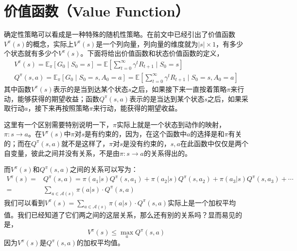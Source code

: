 \documentclass[a4paper]{article}
\begin{document}
\section{价值函数（Value Function）}
确定性策略可以看成是一种特殊的随机性策略。在前文中已经引出了价值函数$V^\pi(s)$的概念，实际上$V^\pi(s)$是一个列向量，列向量的维度就为$|s|\times 1$，有多少个状态就有多少个$V^\pi(s)$。下面将给出价值函数和状态价值函数的定义，
\begin{equation}\begin{array}{l}
V^{\pi}(s)=\mathbb{E}_{\pi}\left[G_{0} \mid S_{0}=s\right]=\mathbb{E}\left[\sum_{t=0}^{\infty} \gamma^{t} R_{t+1} \mid S_{0}=s\right] \\
Q^{\pi}(s, a)=\mathbb{E}_{\pi}\left[G_{0} \mid S_{0}=s, A_{0}=a\right]=\mathbb{E}\left[\sum_{t=0}^{\infty} \gamma^{t} R_{t+1} \mid S_{0}=s, A_{0}=a\right]
\end{array}\end{equation}
其中函数$V^\pi(s)$表示的是当到达某个状态$s$之后，如果接下来一直按着策略$\pi$来行动，能够获得的期望收益；函数$Q^\pi(s,a)$表示的是当达到某个状态$s$之后，如果采取行动$a$，接下来再按照策略$\pi$来行动，能获得的期望收益。

这里有一个区别需要特别说明一下，$\pi$实际上就是一个状态到动作的映射，$\pi:s \to a$。在$V^\pi(s)$中$\pi$对$s$是有约束的，因为，在这个函数中$a$的选择是和$\pi$有关的；而在$Q^{\pi}(s, a)$就不是这样了，$\pi$对$s$是没有约束的，$s,a$在此函数中仅仅是两个自变量，彼此之间并没有关系，不是由$\pi:s \to a$的关系得出的。

而$V^\pi(s)$和$Q^{\pi}(s, a)$之间的关系可以写为：
\begin{equation}
    \begin{aligned}
    V^\pi(s) = & Q^{\pi}(s, a) = \pi(a_1|s)Q^\pi(s,a_1) + \pi(a_2|s)Q^\pi(s,a_2) + \pi(a_3|s)Q^\pi(s,a_3) + \cdots \\
    = & \sum_{a\in\mathcal{A}(s)} \pi(a|s)\cdot Q^\pi(s,a)
    \end{aligned}
\end{equation}
我们可以看到$V^\pi(s) = \sum_{a\in\mathcal{A}(s)} \pi(a|s)\cdot Q^\pi(s,a)$实际上是一个加权平均值。我们已经知道了它们两之间的这层关系，那么还有别的关系吗？显而易见的是，
\begin{equation}
    V^\pi(s) \leq \max_a Q^\pi(s,a)
\end{equation}
因为$V^\pi(s)$是$Q^\pi(s,a)$的加权平均值。
\end{document}
